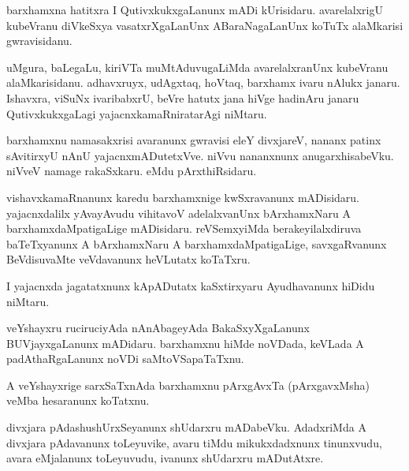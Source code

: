 \documentclass{article}
\begin{document}
\begin{mn}
barxhamxna hatitxra I QutivxkukxgaLanunx  mADi kUrisidaru.  avarelalxrigU kubeVranu 
diVkeSxya vasatxrXgaLanUnx  ABaraNagaLanUnx koTuTx alaMkarisi gwravisidanu.
\end{mn}

\begin{mn}
uMgura, baLegaLu, kiriVTa muMtAduvugaLiMda avarelalxranUnx kubeVranu alaMkarisidanu.  
adhavxruyx,  udAgxtaq,  hoVtaq,  barxhamx  ivaru nAlukx janaru.  Ishavxra,  viSuNx  ivaribabxrU,  
beVre hatutx jana hiVge hadinAru  janaru  QutivxkukxgaLagi  yajacnxkamaRniratarAgi  niMtaru.
\end{mn}

\begin{mn}
barxhamxnu namasakxrisi avaranunx  gwravisi  eleY divxjareV,  nananx patinx  
sAvitirxyU nAnU yajacnxmADutetxVve.  niVvu  nananxnunx  anugarxhisabeVku.  
niVveV namage rakaSxkaru.  eMdu pArxthiRsidaru.
\end{mn}

\begin{mn}
vishavxkamaRnanunx  karedu  barxhamxnige  kwSxravanunx  mADisidaru.  yajacnxdalilx  
yAvayAvudu vihitavoV adelalxvanUnx  bArxhamxNaru A barxhamxdaMpatigaLige mADisidaru.  
reVSemxyiMda berakeyilalxdiruva  baTeTxyanunx A bArxhamxNaru  A barxhamxdaMpatigaLige,  
savxgaRvanunx  BeVdisuvaMte veVdavanunx heVLutatx koTaTxru.
\end{mn}

\begin{mn}
I yajacnxda jagatatxnunx kApADutatx kaSxtirxyaru Ayudhavanunx hiDidu niMtaru.
\end{mn}

\begin{mn}
veYshayxru ruciruciyAda nAnAbageyAda BakaSxyXgaLanunx  BUVjayxgaLanunx mADidaru.  
barxhamxnu  hiMde noVDada, keVLada A padAthaRgaLanunx noVDi saMtoVSapaTaTxnu.
\end{mn}

\begin{mn}

A veYshayxrige sarxSaTxnAda barxhamxnu pArxgAvxTa (pArxgavxMsha) veMba hesaranunx koTatxnu.
\end{mn}

\begin{mn}
divxjara pAdashushUrxSeyanunx  shUdarxru mADabeVku.  AdadxriMda A divxjara pAdavanunx  toLeyuvike, 
avaru tiMdu mikukxdadxnunx  tinunxvudu,  avara eMjalanunx  toLeyuvudu, ivanunx  shUdarxru mADutAtxre.
\end{mn}
\end{document}

